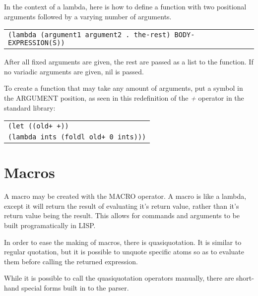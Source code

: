 \documentclass[
letterpaper,
oneside,
]{memoir}
\begin{document}
\filbreak

\noindent
In the context of a lambda, here is how to define a function with two positional arguments followed by a varying number of arguments.

\vspace{1em}
\begin{tabular}{l}
  \texttt{(lambda (argument1 argument2 . the-rest) BODY-EXPRESSION(S))} \\
\end{tabular}
\vspace{0em} %

\noindent
After all fixed arguments are given, the rest are passed as a list to the function. If no variadic arguments are given, nil is passed.

\vspace{1em}
\noindent
To create a function that may take any amount of arguments, put a symbol in the ARGUMENT position, as seen in this redefinition of the \emph{+} operator in the standard library:

\vspace{1em}
\begin{tabular}{l}
  \texttt{(let ((old+ +))} \\
  \qquad\texttt{(lambda ints (foldl old+ 0 ints)))} \\
\end{tabular}
\vspace{1em}

\chapter{Macros}

A macro may be created with the MACRO operator. A macro is like a lambda, except it will return the result of evaluating it’s return value, rather than it’s return value being the result. This allows for commands and arguments to be built programatically in LISP.

\vspace{1em}
\noindent
In order to ease the making of macros, there is quasiquotation. It is similar to regular quotation, but it is possible to unquote specific atoms so as to evaluate them before calling the returned expression.

\vspace{1em}
\noindent
While it is possible to call the quasiquotation operators manually, there are short-hand special forms built in to the parser.
\end{document}
